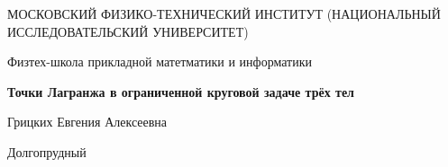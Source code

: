 \begin{titlepage}
        \clearpage\thispagestyle{main}
	\begin{center}
		{\large МОСКОВСКИЙ ФИЗИКО-ТЕХНИЧЕСКИЙ ИНСТИТУТ (НАЦИОНАЛЬНЫЙ ИССЛЕДОВАТЕЛЬСКИЙ УНИВЕРСИТЕТ)}
	\end{center}
	\begin{center}
		{\large Физтех-школа прикладной матетматики и информатики}
	\end{center}


	\vspace{4.5cm}
	{\huge
		\begin{center}
			{\bf Точки Лагранжа в ограниченной круговой задаче трёх тел }\\

		\end{center}
	}
	\vspace{6cm}
	\begin{flushright}
		{\LARGE Грицких Евгения Алексеевна \\
			\vspace{0.2cm}
			}
	\end{flushright}
	\vspace{1cm}
	\begin{center}
		Долгопрудный\\
	\end{center}
\end{titlepage}
